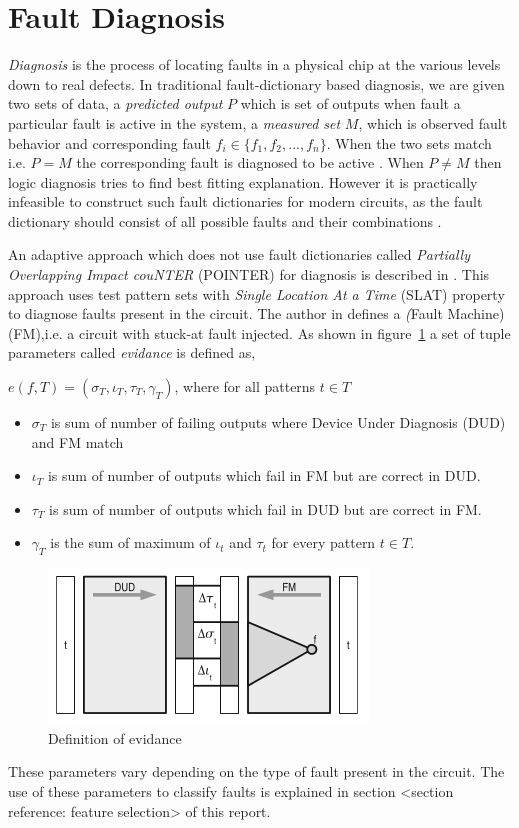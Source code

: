 \section{Fault Diagnosis}
\label{sec:secfd}
\emph{Diagnosis} is the process of locating faults in a physical chip at the various levels down to real defects. In traditional fault-dictionary based diagnosis, we are given two sets of data, a \emph{predicted output} $P$ which is set of outputs when fault a particular fault is active in the system, a \emph{measured set} $M$, which is observed fault behavior and corresponding fault $ f_i \in \{f_1,f_2,...,f_n\} $. When the two sets match i.e. $P = M$ the corresponding fault is diagnosed to be active . When $P \neq M$ then logic diagnosis tries to find best fitting explanation. However it is practically infeasible to construct such fault dictionaries for modern circuits, as the fault dictionary should consist of all possible faults and their combinations \cite{Wang2010}. 

An adaptive approach which does not use fault dictionaries called \emph{Partially Overlapping Impact couNTER} (POINTER) for diagnosis is described in \cite{Holst2009}. This approach uses test pattern sets with \emph{Single Location At a Time} (SLAT) property \cite{Bartenstein2001} to diagnose faults present in the circuit. The author in \cite{Holst2009} defines a \emph(Fault Machine) (FM),i.e. a circuit with stuck-at fault injected. As shown in figure~\ref{fig:evidance} a set of tuple parameters called
\emph{evidance} is defined as,

$e(f,T) = (\sigma_T, \iota_T, \tau_T, \gamma_T)$, where for all patterns $t \in T$

\begin{itemize}
	\item $\sigma_T$ is sum of number of failing outputs where Device Under Diagnosis (DUD) and FM match
	\item $\iota_T$ is sum of number of outputs which fail in FM but are correct in DUD.
	\item $\tau_T$ is sum of number of outputs which fail in DUD but are correct in FM.
 	\item $\gamma_T$ is the sum of maximum of $\iota_t $ and $\tau_t$ for every pattern $t \in T$.
\end{itemize}

\begin{figure}[h]
  \begin{center}
    \captionsetup{justification=centering}
    \includegraphics[scale=0.75]{figures/evidance.png}
    \caption{Definition of evidance}
    \label{fig:evidance}
  \end{center}
\end{figure}

These parameters vary depending on the type of fault present in the circuit. The use of these parameters to classify faults is explained in section <section reference: feature selection> of this report.  



